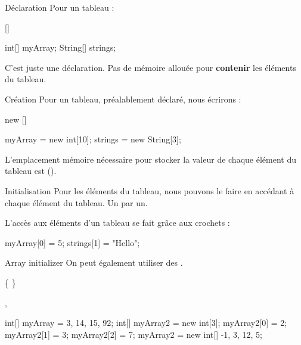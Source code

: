 \begin{frame}[fragile]{Déclaration}
  Pour  un tableau :

\begin{grammaire}
    [] 
\end{grammaire}

\begin{java}
int[] myArray;
String[] strings;
\end{java}

  \pause
  C'est juste une déclaration. Pas de mémoire allouée pour \textbf{contenir} les
  éléments du tableau.

\end{frame}

\begin{frame}[fragile]{Création}
  Pour  un tableau, préalablement déclaré, nous écrirons :
\begin{grammaire}
    new []
\end{grammaire}

\begin{java}
myArray = new int[10];
strings = new String[3];
\end{java}

  \pause
  L'emplacement mémoire nécessaire pour stocker la valeur de chaque élément
  du tableau est  ().
\end{frame}

\begin{frame}[fragile]{Initialisation}
  Pour  les éléments du tableau, nous pouvons le faire en
  accédant à chaque élément du tableau. Un par un.

  L'accès aux éléments d'un tableau se fait grâce aux crochets
   :
\begin{java}
myArray[0] = 5;
strings[1] = "Hello";
\end{java}
\end{frame}

\begin{frame}[fragile]{Array initializer}
  On peut également utiliser des .
\begin{grammaire}
    \{ \grammarrule{[VariableInitializerList]} \}

     \grammarrule{[}, \grammarrule{Expression ]}
\end{grammaire}

\begin{java}
int[] myArray = {3, 14, 15, 92};
int[] myArray2 = new int[3];
myArray2[0] = 2;
myArray2[1] = 3;
myArray2[2] = 7;
myArray2 = new int[] {-1, 3, 12, 5};
\end{java}
\end{frame}


